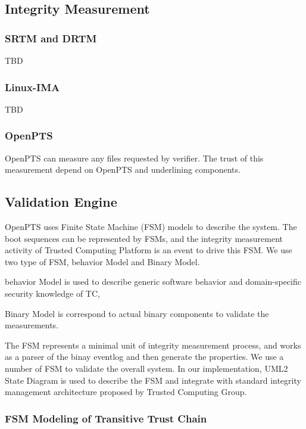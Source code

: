 \documentclass[12pt,a4paper]{article}
\begin{document}
\clearpage 


\subsection{Integrity Measurement}

\subsubsection{SRTM and DRTM}

TBD

\subsubsection{Linux-IMA}

TBD

\subsubsection{OpenPTS}

OpenPTS can measure any files requested by verifier.
The trust of this measurement depend on OpenPTS and underlining components.

\subsection{Validation Engine}

OpenPTS uses Finite State Machine (FSM) models to describe the system.
The boot sequences can be represented by FSMs, 
and the integrity measurement activity of Trusted Computing Platform is an event to drive this FSM.
We use two type of FSM, behavior Model and Binary Model.

behavior Model is used to describe generic software behavior and domain-specific security knowledge of TC, 

Binary Model is correspond to actual binary components to validate the measurements. 

The FSM represents a minimal unit of integrity measurement process, 
and works as a parser of the binay eventlog and then generate the properties.
We use a number of FSM to validate the overall system. 
In our implementation, UML2 State Diagram is used to describe the FSM and integrate 
with standard integrity management architecture proposed by Trusted Computing Group.


\subsubsection{FSM Modeling of Transitive Trust Chain}  
\end{document}
